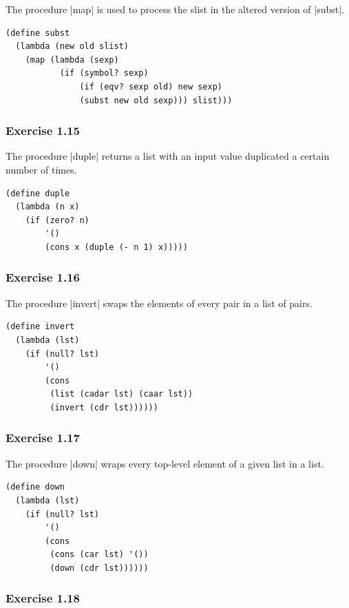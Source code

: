 \documentclass[a4paper]{article}
\begin{document}
The procedure |map| is used to process the slist in the altered version of |subst|.

\begin{lstlisting}
(define subst
  (lambda (new old slist)
    (map (lambda (sexp)
           (if (symbol? sexp)
               (if (eqv? sexp old) new sexp)
               (subst new old sexp))) slist)))
\end{lstlisting}

\subsubsection{Exercise 1.15}

The procedure |duple| returns a list with an input value duplicated a certain number of times.

\begin{lstlisting}
(define duple
  (lambda (n x)
    (if (zero? n)
        '()
        (cons x (duple (- n 1) x)))))
\end{lstlisting}

\subsubsection{Exercise 1.16}

The procedure |invert| swaps the elements of every pair in a list of pairs.

\begin{lstlisting}
(define invert
  (lambda (lst)
    (if (null? lst)
        '()
        (cons
         (list (cadar lst) (caar lst))
         (invert (cdr lst))))))
\end{lstlisting}

\subsubsection{Exercise 1.17}

The procedure |down| wraps every top-level element of a given list in a list.

\begin{lstlisting}
(define down
  (lambda (lst)
    (if (null? lst)
        '()
        (cons
         (cons (car lst) '())
         (down (cdr lst))))))
\end{lstlisting}

\subsubsection{Exercise 1.18}
\end{document}
